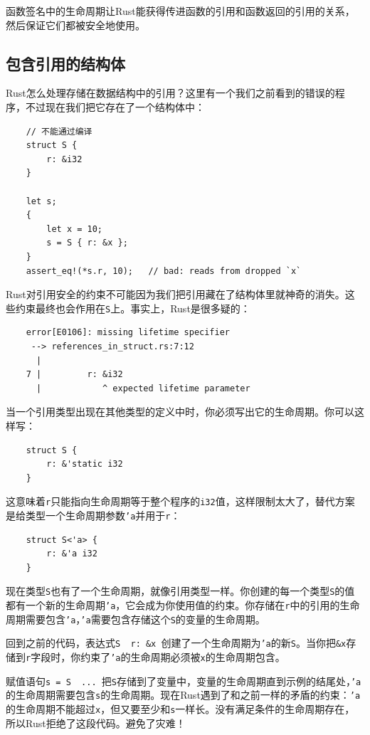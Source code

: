 函数签名中的生命周期让Rust能获得传进函数的引用和函数返回的引用的关系，然后保证它们都被安全地使用。

\subsection{包含引用的结构体}\label{refstruct}

Rust怎么处理存储在数据结构中的引用？这里有一个我们之前看到的错误的程序，不过现在我们把它存在了一个结构体中：
\begin{verbatim}
    // 不能通过编译
    struct S {
        r: &i32
    }
    
    let s;
    {
        let x = 10;
        s = S { r: &x };
    }
    assert_eq!(*s.r, 10);   // bad: reads from dropped `x`
\end{verbatim}

Rust对引用安全的约束不可能因为我们把引用藏在了结构体里就神奇的消失。这些约束最终也会作用在\texttt{S}上。事实上，Rust是很多疑的：
\begin{verbatim}
    error[E0106]: missing lifetime specifier
     --> references_in_struct.rs:7:12
      |
    7 |         r: &i32
      |            ^ expected lifetime parameter
\end{verbatim}

当一个引用类型出现在其他类型的定义中时，你必须写出它的生命周期。你可以这样写：
\begin{verbatim}
    struct S {
        r: &'static i32
    }
\end{verbatim}

这意味着\texttt{r}只能指向生命周期等于整个程序的\texttt{i32}值，这样限制太大了，替代方案是给类型一个生命周期参数\texttt{'a}并用于\texttt{r}：
\begin{verbatim}
    struct S<'a> {
        r: &'a i32
    }
\end{verbatim}

现在类型\texttt{S}也有了一个生命周期，就像引用类型一样。你创建的每一个类型\texttt{S}的值都有一个新的生命周期\texttt{'a}，它会成为你使用值的约束。你存储在\texttt{r}中的引用的生命周期需要包含\texttt{'a}，\texttt{'a}需要包含存储这个\texttt{S}的变量的生命周期。

回到之前的代码，表达式\texttt{S { r: \&x }}创建了一个生命周期为\texttt{'a}的新\texttt{S}。当你把\texttt{\&x}存储到\texttt{r}字段时，你约束了\texttt{'a}的生命周期必须被\texttt{x}的生命周期包含。

赋值语句\texttt{s = S { ... }}把\texttt{S}存储到了变量中，变量的生命周期直到示例的结尾处，\texttt{'a}的生命周期需要包含\texttt{s}的生命周期。现在Rust遇到了和之前一样的矛盾的约束：\texttt{'a}的生命周期不能超过\texttt{x}，但又要至少和\texttt{s}一样长。没有满足条件的生命周期存在，所以Rust拒绝了这段代码。避免了灾难！

